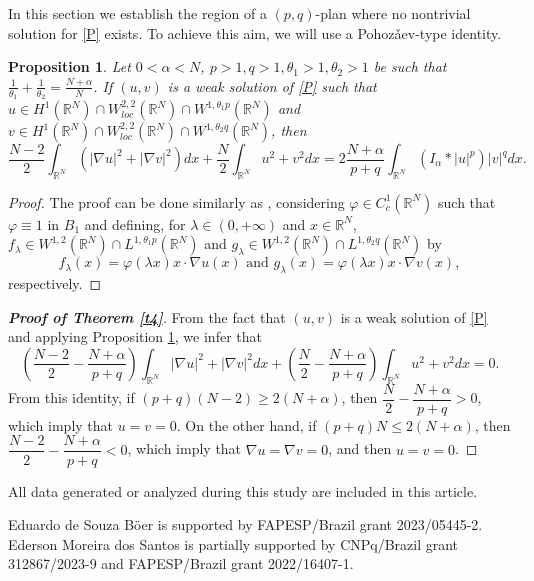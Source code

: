 \documentclass[12pt,a4paper]{article}
\newtheorem{proposition}[theorem]{Proposition}
\numberwithin{equation}{section}
\begin{document}
In this section we establish the region of a $(p, q)$-plan where no nontrivial solution for \eqref{P} exists. To achieve this aim, we will use a Pohoz\v{a}ev-type identity.

\begin{proposition}\label{p1}
Let $0 < \alpha< N$, $p>1, q>1, \theta_1>1, \theta_2> 1$ be such that $\frac{1}{\theta_1}+ \frac{1}{\theta_ 2} = \frac{N+\alpha}{N}$. If $(u, v)$ is a weak solution of \eqref{P} such that $u\in H^{1}(\mathbb{R}^N) \cap W_{loc}^{2, 2}(\mathbb{R}^N)\cap W^{1, \theta_1 p}(\mathbb{R}^N)$ and $v\in H^{1}(\mathbb{R}^N)\cap W_{loc}^{2, 2}(\mathbb{R}^N)\cap W^{1, \theta_2 q}(\mathbb{R}^N)$, then
$$
\dfrac{N-2}{2}\int_{\mathbb{R}^N} (|\nabla u|^2+|\nabla v|^2) dx + \dfrac{N}{2}\int_{\mathbb{R}^N} u^2 + v^2 dx = 2\dfrac{N+\alpha}{p+q}\int_{\mathbb{R}^N} (I_\alpha \ast |u|^p)|v|^q dx. 
$$
\end{proposition} 
\begin{proof}
The proof can be done similarly as \cite[Proposition 3.1]{Moroz2013}, considering $\varphi\in C_{c}^{1}(\mathbb{R}^N)$ such that $\varphi \equiv 1$ in $B_1$ and defining, for $\lambda\in (0, +\infty)$ and $x\in \mathbb{R}^N$, $f_\lambda \in W^{1, 2}(\mathbb{R}^N)\cap L^{1, \theta_1 p}(\mathbb{R}^N)$ and $g_\lambda \in W^{1, 2}(\mathbb{R}^N)\cap L^{1, \theta_2 q}(\mathbb{R}^N)$ by
$$
f_\lambda(x)=\varphi(\lambda x)x\cdot \nabla u(x) \mbox{ \ \ \ and \ \ \ } g_\lambda(x)=\varphi(\lambda x)x\cdot \nabla v(x),
$$
respectively.
\end{proof}

\begin{proof}[{\bf Proof of Theorem \ref{t4}}]
From the fact that $(u, v)$ is a weak solution of \eqref{P} and applying Proposition \ref{p1}, we infer that
$$
\left(\dfrac{N-2}{2}-\dfrac{N+\alpha}{p+q}\right)\int_{\mathbb{R}^N} |\nabla u|^2 + |\nabla v|^2 dx + \left(\dfrac{N}{2}-\dfrac{N+\alpha}{p+q}\right)\int_{\mathbb{R}^N} u^2 + v^2 dx = 0.
$$
From this identity, if $(p+q)(N-2) \geq 2(N+\alpha)$, then $\dfrac{N}{2}-\dfrac{N+\alpha}{p+q}>0$, which imply that $u=v=0$. On the other hand, if $(p+q)N \leq 2(N+\alpha)$, then $\dfrac{N-2}{2}-\dfrac{N+\alpha}{p+q}<0$, which imply that  $\nabla u=\nabla v=0$, and then $u=v=0$.
\end{proof}


 All data generated or analyzed during this study are included in this article.

\medbreak

 Eduardo de Souza B\"oer is supported by FAPESP/Brazil grant 2023/05445-2. \linebreak Ederson Moreira dos Santos is partially supported by CNPq/Brazil grant 312867/2023-9 and \linebreak FAPESP/Brazil grant 2022/16407-1.
\end{document}
